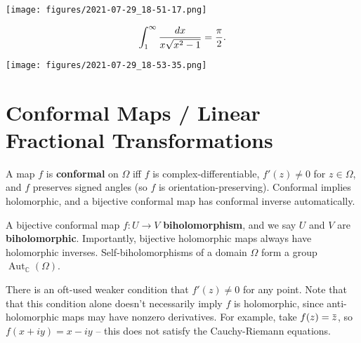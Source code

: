 \begin{solution}

\texttt{[image: figures/2021-07-29\_18-51-17.png]}

\end{solution}

\begin{exercise}[?]

\begin{align*}
\int_{1}^{\infty} \frac{d x}{x \sqrt{x^{2}-1}} = {\pi \over 2}
.\end{align*}

\end{exercise}

\begin{solution}

\texttt{[image: figures/2021-07-29\_18-53-35.png]}

\end{solution}

\hypertarget{conformal-maps-linear-fractional-transformations}{%
\section{Conformal Maps / Linear Fractional
Transformations}\label{conformal-maps-linear-fractional-transformations}}

\begin{definition}

A map \(f\) is \textbf{conformal} on \(\Omega\) iff \(f\) is
complex-differentiable, \(f'(z)\neq 0\) for \(z\in \Omega\), and \(f\)
preserves signed angles (so \(f\) is orientation-preserving). Conformal
implies holomorphic, and a bijective conformal map has conformal inverse
automatically.

A bijective conformal map \(f:U\to V\) \textbf{biholomorphism}, and we
say \(U\) and \(V\) are \textbf{biholomorphic}. Importantly, bijective
holomorphic maps always have holomorphic inverses. Self-biholomorphisms
of a domain \(\Omega\) form a group
\(\mathop{\mathrm{Aut}}_{\mathbb{C}}(\Omega)\).

\end{definition}

\begin{remark}

There is an oft-used weaker condition that \(f'(z) \neq 0\) for any
point. Note that that this condition alone doesn't necessarily imply
\(f\) is holomorphic, since anti-holomorphic maps may have nonzero
derivatives. For example, take
\(f(z) = \mkern 1.5mu\overline{\mkern-1.5muz\mkern-1.5mu}\mkern 1.5mu\),
so \(f(x+iy) = x-iy\) -- this does not satisfy the Cauchy-Riemann
equations.

\end{remark}

